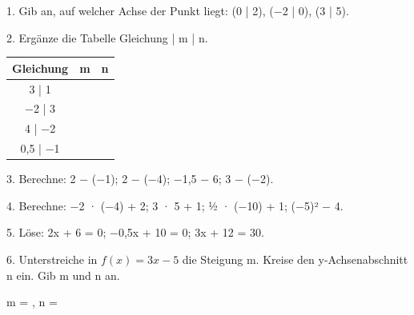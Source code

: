 \documentclass[11pt]{article}
\begin{document}
\pfheftstil
{}
\pfrueckblick
\begin{pfaufg}{}{1.}{}
Gib an, auf welcher Achse der Punkt liegt: (0 | 2), ($-$2 | 0), (3 | 5).
\end{pfaufg}
\begin{pfaufg}{}{2.}{}
Ergänze die Tabelle Gleichung | m | n.
\par\smallskip\noindent \begingroup\renewcommand{\arraystretch}{1.3}\begin{tabular}{|c|c|c|}\hline \textbf{Gleichung} & \textbf{m} & \textbf{n} \\ \hline 3 | 1 & \rule{0pt}{3ex}\hspace{1.6cm} & \rule{0pt}{3ex}\hspace{1.6cm} \\ \hline $-$2 | 3 & \rule{0pt}{3ex}\hspace{1.6cm} & \rule{0pt}{3ex}\hspace{1.6cm} \\ \hline 4 | $-$2 & \rule{0pt}{3ex}\hspace{1.6cm} & \rule{0pt}{3ex}\hspace{1.6cm} \\ \hline 0,5 | $-$1 & \rule{0pt}{3ex}\hspace{1.6cm} & \rule{0pt}{3ex}\hspace{1.6cm} \\ \hline\end{tabular}\endgroup\par
{}
\end{pfaufg}
\begin{pfaufg}{}{3.}{}
Berechne: 2 $-$ ($-$1); 2 $-$ ($-$4); $-$1,5 $-$ 6; 3 $-$ ($-$2).
\end{pfaufg}
\begin{pfaufg}{}{4.}{}
Berechne: $-$2 · ($-$4) + 2; 3 · 5 + 1; ½ · ($-$10) + 1; ($-$5)² $-$ 4.
\end{pfaufg}
\begin{pfaufg}{}{5.}{}
Löse: 2x + 6 = 0; $-$0,5x + 10 = 0; 3x + 12 = 30.
\end{pfaufg}
\pfgruppe{}
\begin{pfaufg}{}{6.}{}
Unterstreiche in $f(x) = 3x - 5$ die Steigung m. Kreise den y-Achsenabschnitt n ein. Gib m und n an.
\par\noindent m = \leerfeld , n = \leerfeld \par
{}
\end{pfaufg}
\end{document}

